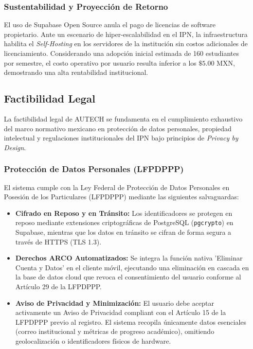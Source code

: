 \subsubsection{Sustentabilidad y Proyección de Retorno}
El uso de Supabase Open Source anula el pago de licencias de software propietario. Ante un escenario de hiper-escalabilidad en el IPN, la infraestructura habilita el \textit{Self-Hosting} en los servidores de la institución sin costos adicionales de licenciamiento. Considerando una adopción inicial estimada de 160 estudiantes por semestre, el costo operativo por usuario resulta inferior a los $\$5.00$ MXN, demostrando una alta rentabilidad institucional.

\subsection{Factibilidad Legal}
\label{subsec:factibilidad_legal}

La factibilidad legal de AUTECH se fundamenta en el cumplimiento exhaustivo del marco normativo mexicano en protección de datos personales, propiedad intelectual y regulaciones institucionales del IPN bajo principios de \textit{Privacy by Design}.

\subsubsection{Protección de Datos Personales (LFPDPPP)}
El sistema cumple con la Ley Federal de Protección de Datos Personales en Posesión de los Particulares (LFPDPPP) mediante las siguientes salvaguardas:
\begin{itemize}
    \item \textbf{Cifrado en Reposo y en Tránsito:} Los identificadores se protegen en reposo mediante extensiones criptográficas de PostgreSQL (\texttt{pgcrypto}) en Supabase, mientras que los datos en tránsito se cifran de forma segura a través de HTTPS (TLS 1.3).
    \item \textbf{Derechos ARCO Automatizados:} Se integra la función nativa 'Eliminar Cuenta y Datos' en el cliente móvil, ejecutando una eliminación en cascada en la base de datos cloud que revoca el consentimiento del usuario conforme al Artículo 29 de la LFPDPPP.
    \item \textbf{Aviso de Privacidad y Minimización:} El usuario debe aceptar activamente un Aviso de Privacidad compliant con el Artículo 15 de la LFPDPPP previo al registro. El sistema recopila únicamente datos esenciales (correo institucional y métricas de progreso académico), omitiendo geolocalización o identificadores físicos de hardware.
\end{itemize}

